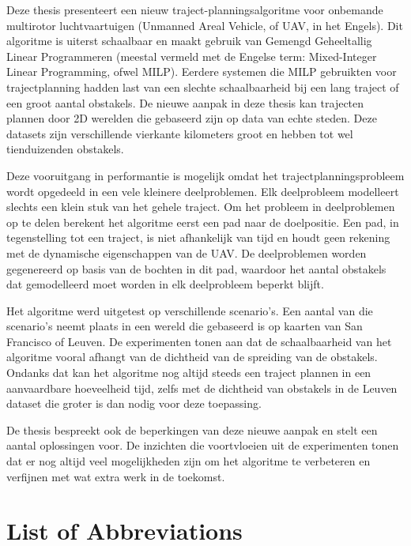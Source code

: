 \documentclass[
master=cws,
masteroption=ai,
english,
]{kulemt}
\begin{document}
\begin{abstract*}
Deze thesis presenteert een nieuw traject-planningsalgoritme voor onbemande multirotor luchtvaartuigen (Unmanned Areal Vehicle, of UAV, in het Engels). Dit algoritme is uiterst schaalbaar en maakt gebruik van Gemengd  Geheeltallig Linear Programmeren (meestal vermeld met de Engelse term: Mixed-Integer Linear Programming, ofwel MILP). Eerdere systemen die MILP gebruikten voor trajectplanning hadden last van een slechte schaalbaarheid bij een lang traject of een groot aantal obstakels. De nieuwe aanpak in deze thesis kan trajecten plannen door 2D werelden die gebaseerd zijn op data van echte steden. Deze datasets zijn verschillende vierkante kilometers groot en hebben tot wel tienduizenden obstakels.
\par
Deze vooruitgang in performantie is mogelijk omdat het trajectplanningsprobleem wordt opgedeeld in een vele kleinere deelproblemen. Elk deelprobleem modelleert slechts een klein stuk van het gehele traject. Om het probleem in deelproblemen op te delen berekent het algoritme eerst een pad naar de doelpositie. Een pad, in tegenstelling tot een traject, is niet afhankelijk van tijd en houdt geen rekening met de dynamische eigenschappen van de UAV. De deelproblemen worden gegenereerd op basis van de bochten in dit pad, waardoor het aantal obstakels dat gemodelleerd moet worden in elk deelprobleem beperkt blijft.
\par
Het algoritme werd uitgetest op verschillende scenario's. Een aantal van die scenario's neemt plaats in een wereld die gebaseerd is op kaarten van San Francisco of Leuven. De experimenten tonen aan dat de schaalbaarheid van het algoritme vooral afhangt van de dichtheid van de spreiding van de obstakels. Ondanks dat kan het algoritme nog altijd steeds een traject plannen in een aanvaardbare hoeveelheid tijd, zelfs met de dichtheid van obstakels in de Leuven dataset die groter is dan nodig voor deze toepassing.
\par
De thesis bespreekt ook de beperkingen van deze nieuwe aanpak en stelt een aantal oplossingen voor. De inzichten die voortvloeien uit de experimenten tonen dat er nog altijd veel mogelijkheden zijn om het algoritme te verbeteren en verfijnen met wat extra werk in de toekomst.
\end{abstract*}

\listoffigures
\listoftables

\chapter{List of Abbreviations}
\end{document}
